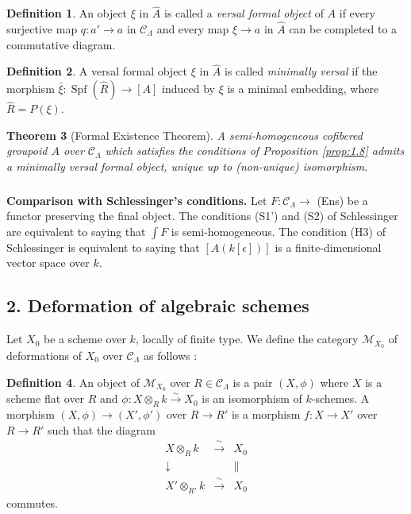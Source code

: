 \documentclass[11pt]{article}
\theoremstyle{plain}
\newtheorem{theorem}{Theorem}[section]
\theoremstyle{definition}
\newtheorem{definition}[theorem]{Definition}
\theoremstyle{remark}
\DeclareMathOperator{\Spf}{Spf}
\begin{document}
\begin{definition}
An object $\xi$ in $\hat{A}$ is called a \emph{versal formal object} of $A$ if every surjective map $q: a' \to a$ in $\mathcal{C}_\Lambda$ and every map $\xi \to a$ in $\hat{A}$ can be completed to a commutative diagram.
\end{definition}

\begin{definition}
A versal formal object $\xi$ in $\hat{A}$ is called \emph{minimally versal} if the morphism $\bar{\xi}: \Spf(\hat{R}) \to [A]$ induced by $\xi$ is a minimal embedding, where $\hat{R} = P(\xi)$.
\end{definition}

\begin{theorem}[Formal Existence Theorem]
A semi-homogeneous cofibered groupoid $A$ over $\mathcal{C}_\Lambda$ which satisfies the conditions of Proposition \ref{prop:1.8} admits a minimally versal formal object, unique up to (non-unique) isomorphism.
\end{theorem}

\subsubsection{}
\textbf{Comparison with Schlessinger's conditions.} Let $F: \mathcal{C}_\Lambda \to$ (Ens) be a functor preserving the final object. The conditions (S1') and (S2) of Schlessinger are equivalent to saying that $\int F$ is semi-homogeneous. The condition (H3) of Schlessinger is equivalent to saying that $[A(k[\epsilon])]$ is a finite-dimensional vector space over $k$.

\subsection*{2. Deformation of algebraic schemes}

Let $X_0$ be a scheme over $k$, locally of finite type. We define the category $\mathcal{M}_{X_0}$ of deformations of $X_0$ over $\mathcal{C}_\Lambda$ as follows :

\begin{definition}
An object of $\mathcal{M}_{X_0}$ over $R \in \mathcal{C}_\Lambda$ is a pair $(X, \phi)$ where $X$ is a scheme flat over $R$ and $\phi: X \otimes_R k \xrightarrow{\sim} X_0$ is an isomorphism of $k$-schemes. A morphism $(X, \phi) \to (X', \phi')$ over $R \to R'$ is a morphism $f: X \to X'$ over $R \to R'$ such that the diagram
\[
\begin{array}{ccc}
X \otimes_R k & \xrightarrow{\;\sim\;} & X_0 \\
\downarrow & & \|\\
X' \otimes_{R'} k & \xrightarrow{\;\sim\;} & X_0
\end{array}
\]
commutes.
\end{definition}
\end{document}
